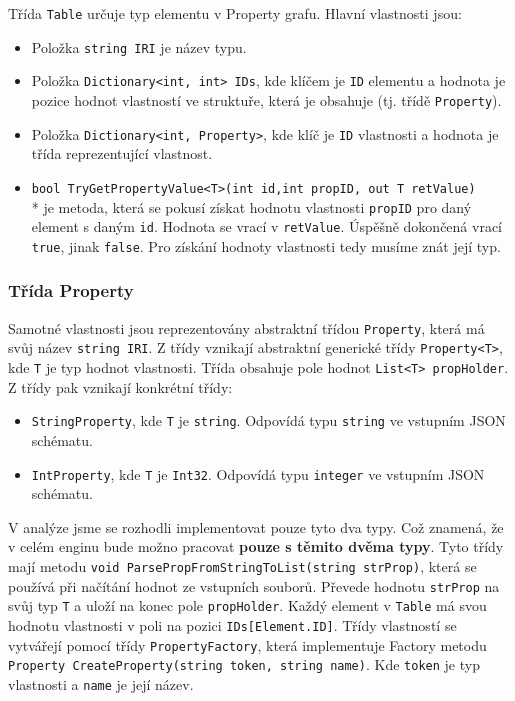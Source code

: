 Třída \texttt{Table} určuje typ elementu v Property grafu.
Hlavní vlastnosti jsou:
\begin{itemize}
\item Položka \texttt{string IRI} je název typu.
\item Položka \texttt{Dictionary<int, int> IDs}, kde klíčem je \texttt{ID} elementu a hodnota je pozice hodnot vlastností ve struktuře, která je obsahuje (tj. třídě \texttt{Property}).
\item Položka \texttt{Dictionary<int, Property>}, kde klíč je \texttt{ID} vlastnosti a hodnota je třída reprezentující vlastnost.
\item \texttt{bool TryGetPropertyValue<T>(int id,int propID, out T retValue)}\\* 
je metoda, která se pokusí získat hodnotu vlastnosti \texttt{propID} pro daný element s daným \texttt{id}.
Hodnota se vrací v \texttt{retValue}. Úspěšně dokončená vrací \texttt{true}, jinak \texttt{false}.
Pro získání hodnoty vlastnosti tedy musíme znát její typ.
\end{itemize}

\subsubsection{Třída Property}

Samotné vlastnosti jsou reprezentovány abstraktní třídou \texttt{Property}, která má svůj název \texttt{string IRI}.
Z třídy vznikají abstraktní generické třídy \texttt{Property<T>}, kde \texttt{T} je typ hodnot vlastnosti.
Třída obsahuje pole hodnot \texttt{List<T> propHolder}.
Z třídy pak vznikají konkrétní třídy:
\begin{itemize}
\item \texttt{StringProperty}, kde \texttt{T} je \texttt{string}. Odpovídá typu \texttt{string} ve vstupním JSON schématu.
\item \texttt{IntProperty}, kde \texttt{T} je \texttt{Int32}. Odpovídá typu \texttt{integer} ve vstupním JSON schématu.
\end{itemize}
V analýze jsme se rozhodli implementovat pouze tyto dva typy. 
Což znamená, že v celém enginu bude možno pracovat \textbf{pouze s těmito dvěma typy}.
Tyto třídy mají metodu \texttt{void ParsePropFromStringToList(string strProp)}, která se používá při načítání hodnot ze vstupních souborů.
Převede hodnotu \texttt{strProp} na svůj typ \texttt{T} a uloží na konec pole \texttt{propHolder}.
Každý element v \texttt{Table} má svou hodnotu vlastnosti v poli na pozici \texttt{IDs[Element.ID]}.
Třídy vlastností se vytvářejí pomocí třídy \texttt{PropertyFactory}, která implementuje Factory metodu \citep[str. 107]{patterns} \texttt{Property CreateProperty(string token, string name)}.
Kde \texttt{token} je typ vlastnosti a \texttt{name} je její název.

